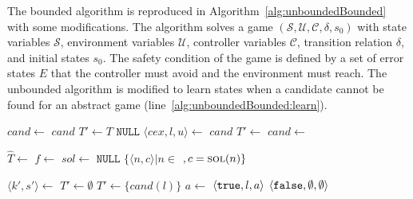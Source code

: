 The bounded algorithm is reproduced in Algorithm~\ref{alg:unboundedBounded} with some modifications. The algorithm solves a game $(\mathcal{S}, \mathcal{U}, \mathcal{C}, \delta, s_0)$ with state variables $\mathcal{S}$, environment variables $\mathcal{U}$, controller variables $\mathcal{C}$, transition relation $\delta$, and initial states $s_0$. The safety condition of the game is defined by a set of error states $E$ that the controller must avoid and the environment must reach. The unbounded algorithm is modified to learn states when a candidate cannot be found for an abstract game (line~\ref{alg:unboundedBounded:learn}).

\begin{algorithm}
    \begin{algorithmic}[1]
        \State $cand \gets $  
         \Return $cand$ \EndIIf 
        \State $T' \gets T$
        \Loop
             \Return $\texttt{NULL}$ \EndIIf 
            \State $\langle cex, l, u \rangle \gets $  
             \Return $cand$ \EndIIf 
            \State $T' \gets $  
            \State $cand \gets $  
        \EndLoop
        \EndFunction
    \end{algorithmic}

    \begin{algorithmic}
        \State $\hat{T} \gets $ 
            \State $f \gets $  \EndIfElse
            \State $sol \gets $ 
                \State {}\label{alg:unboundedBounded:learn} \EndIfElse
                \State \Return $\texttt{NULL}$
            \Else
                \State \Return $\{ \langle n, c \rangle | n \in $  $, c = \Call{sol}{n} \}$
            \EndIf
        \EndFunction
    \end{algorithmic}

    \begin{algorithmic}
            \State $\langle k', s'\rangle \gets $ 
                \State $T' \gets \emptyset$
            \Else
                \State $T' \gets \{ cand(l) \}$
            \EndIf
                \State $a \gets $ 
                 \Return $\langle \texttt{true}, l, a \rangle$ \EndIIf
            \EndFor
            \State \Return $\langle \texttt{false}, \emptyset, \emptyset \rangle$
        \EndFunction
    \end{algorithmic}


\end{algorithm}
